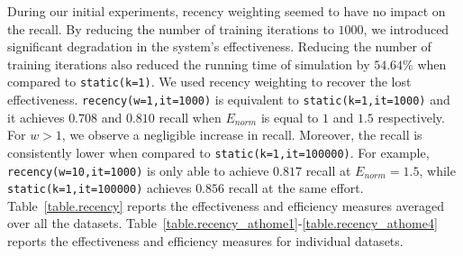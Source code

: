 During our initial experiments, recency weighting seemed to have no
impact on the recall. By reducing the number of training iterations
to $1000$, we introduced significant degradation in the system's effectiveness.
Reducing the number of training iterations also
reduced the running time of simulation by $54.64\%$ when compared to
\texttt{static(k=1)}. We used recency weighting to recover
the lost effectiveness.  \texttt{recency(w=1,it=1000)} is equivalent to
\texttt{static(k=1,it=1000)} and it achieves $0.708$ and $0.810$
recall when $E_{norm}$ is equal to $1$ and $1.5$ respectively. For
$w > 1$, we observe a negligible increase in recall. Moreover,
the recall is consistently lower when compared to
\texttt{static(k=1,it=100000)}. For example, \texttt{recency(w=10,it=1000)} is
only able to achieve $0.817$ recall at $E_{norm}=1.5$, while
\texttt{static(k=1,it=100000)} achieves $0.856$ recall at the same effort.
Table~\ref{table.recency} reports the effectiveness and efficiency measures
averaged over all the datasets.
Table~\ref{table.recency_athome1}-\ref{table.recency_athome4} reports the effectiveness and efficiency measures
for individual datasets.

